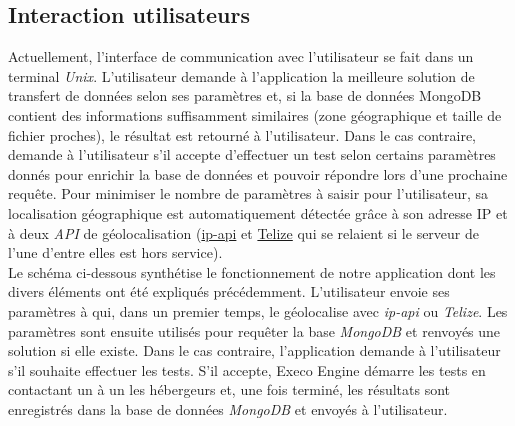 \documentclass[10pt]{article}
\begin{document}
\subsection{Interaction utilisateurs}

Actuellement, l'interface de communication avec l'utilisateur se fait dans un
terminal \textit{Unix}. L'utilisateur demande à l'application la meilleure
solution de transfert de données selon ses paramètres et, si la base de données
MongoDB contient des informations suffisamment similaires (zone géographique et
taille de fichier proches), le résultat est retourné à l'utilisateur. Dans le
cas contraire, \KYD demande à l'utilisateur s'il accepte d'effectuer un
test selon certains paramètres donnés pour enrichir la base de données et
pouvoir répondre lors d'une prochaine requête. Pour minimiser le nombre de
paramètres à saisir pour l'utilisateur, sa localisation géographique est
automatiquement détectée grâce à son adresse IP et à deux \textit{API} de
géolocalisation (\href{http://ip-api.com/docs/api:json}{ip-api} et
\href{http://www.telize.com/}{Telize} qui se relaient si le serveur de l'une
d'entre elles est hors service).\\

Le schéma ci-dessous synthétise le fonctionnement de notre application dont les
divers éléments ont été expliqués précédemment. L'utilisateur envoie ses
paramètres à \KYD qui, dans un premier temps, le géolocalise avec
\textit{ip-api} ou \textit{Telize}. Les paramètres sont ensuite utilisés pour
requêter la base \textit{MongoDB} et renvoyés une solution si elle existe. Dans
le cas contraire, l'application demande à l'utilisateur s'il souhaite effectuer
les tests. S'il accepte, Execo Engine démarre les tests en contactant un à un
les hébergeurs et, une fois terminé, les résultats sont enregistrés dans la
base de données \textit{MongoDB} et envoyés à l'utilisateur.
\end{document}
